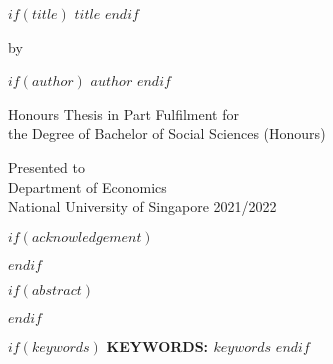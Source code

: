\documentclass[12pt]{article}
\begin{document}
\begin{titlepage}
    \begin{center}
        \vspace*{1cm}

        $if(title)$
            \large{\textbf{\uppercase{$title$}}}
        $endif$

        \vfill

        by

        $if(author)$
            \textbf{\uppercase{$author$}}
        $endif$

        \vfill

        Honours Thesis in Part Fulfilment for\\
        the Degree of Bachelor of Social Sciences (Honours)

        \vspace{0.8cm}


        Presented to\\
        Department of Economics\\
        National University of Singapore 2021/2022

    \end{center}
\end{titlepage}

\fancyfoot[C]{\thepage}
\setlength{\headheight}{15pt}

\newpage
\renewcommand{\abstractname}{\underline{\uppercase{acknowledgement}}}

    $if(acknowledgement)$
        
    $endif$

\newpage


\renewcommand{\abstractname}{\underline{\uppercase{abstract}}}

\newpage
    \begin{centering}

        $if(abstract)$
        \begin{abstract}
            $abstract$
        \end{abstract}

        $endif$


    \end{centering}

    \vfill

    $if(keywords)$
        \textbf{KEYWORDS: $keywords$}
    $endif$
\end{document}
